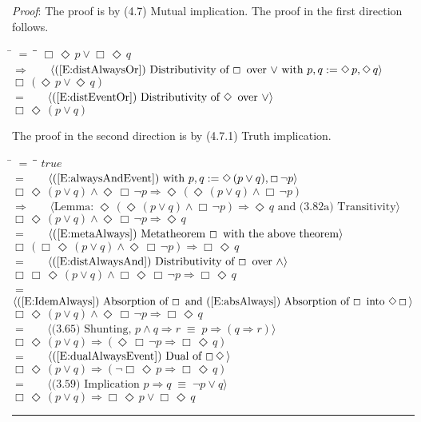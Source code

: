 \documentclass[12pt, fleqn, leqno]{article}
\newcommand{\lgap}{2pt}                             %
\newcommand{\mymathindent}{24pt}                    %
\newcommand{\equivs}{\ensuremath{\;\equiv\;}}       %
\newcommand{\impl}{\ensuremath{\Rightarrow}}        %
\newcommand{\Event}{\Diamond\,}
\newcommand{\Always}{\Box\,}
\newcommand{\myqed}{\rule[-.23ex]{1.2ex}{2.0ex}}
\newcommand{\myqedtab}{\hspace{384pt}}              %
\newcommand{\Gll} {\langle}                         %
\newcommand{\Ggg} {\rangle}                         %
\newcommand{\Hint}[1]     {\ \ \ $\Gll              \mbox{#1} \Ggg$ }   %
\begin{document}
\emph{Proof}: The proof is by (4.7) Mutual implication.
The proof in the first direction follows.
\begin{tabbing}
\hspace{\mymathindent} \= $= \;$ \= \myqedtab \= \kill
  \> \>   $\Always\Event p \lor \Always\Event q$\\[\lgap]
  \> $\impl$  \>  \Hint{(\ref{E:distAlwaysOr}) Distributivity of $\Always$ over $\lor$ with $p,q := \Event p, \Event q$}\\[\lgap]
  \> \>   $\Always(\Event p \lor \Event q)$\\[\lgap]
  \> $=$  \>  \Hint{(\ref{E:distEventOr}) Distributivity of $\Event$ over $\lor$}\\[\lgap]
  \> \>   $\Always\Event(p \lor q)$
\end{tabbing}
The proof in the second direction is by (4.7.1) Truth implication.
\begin{tabbing}
\hspace{\mymathindent} \= $= \;$ \= \myqedtab \= \kill
  \> \>   $true$\\[\lgap]
  \> $=$  \>  \Hint{(\ref{E:alwaysAndEvent}) with $p,q:=\Event(p\lor q),\Always\neg p$}\\[\lgap]
  \> \>   $\Always \Event(p\lor q) \land \Event \Always\neg p \impl \Event (\Event(p\lor q) \land \Always\neg p)$\\[\lgap]
  \> $\impl$  \>  \Hint{Lemma: $\Event (\Event(p\lor q) \land \Always\neg p)\impl\Event q$ and (3.82a) Transitivity}\\[\lgap]
  \> \>   $\Always \Event(p\lor q) \land \Event \Always\neg p \impl \Event q$\\[\lgap]
  \> $=$  \>  \Hint{(\ref{E:metaAlways}) Metatheorem $\Always$ with the above theorem}\\[\lgap]
  \> \>   $\Always (\Always \Event(p\lor q) \land \Event \Always\neg p) \impl \Always\Event q$\\[\lgap]
  \> $=$  \>  \Hint{(\ref{E:distAlwaysAnd}) Distributivity of $\Always$ over $\land$}\\[\lgap]
  \> \>   $\Always\Always \Event(p\lor q) \land \Always\Event \Always\neg p \impl \Always\Event q$\\[\lgap]
  \> $=$  \>  \Hint{(\ref{E:IdemAlways}) Absorption of $\Always$ and (\ref{E:absAlways}) Absorption of $\Always$ into $\Event\Always$}\\[\lgap]
  \> \>   $\Always \Event(p\lor q) \land \Event\Always \neg p \impl \Always\Event q$\\[\lgap]
  \> $=$  \>  \Hint{(3.65) Shunting, $p\land q\impl r\equivs p\impl (q\impl r)$}\\[\lgap]
  \> \>   $\Always \Event(p\lor q) \impl (\Event\Always \neg p \impl \Always\Event q)$\\[\lgap]
  \> $=$  \>  \Hint{(\ref{E:dualAlwaysEvent}) Dual of $\Always\Event$}\\[\lgap]
  \> \>   $\Always \Event(p\lor q) \impl (\neg\Always\Event p \impl \Always\Event q)$\\[\lgap]
	\> $=$  \>  \Hint{(3.59) Implication $p\impl q \equivs \neg p \lor q$}\\[\lgap]
  \> \>   $\Always \Event(p\lor q) \impl \Always\Event p \lor \Always\Event q$ \quad \myqed
\end{tabbing}
\end{document}
